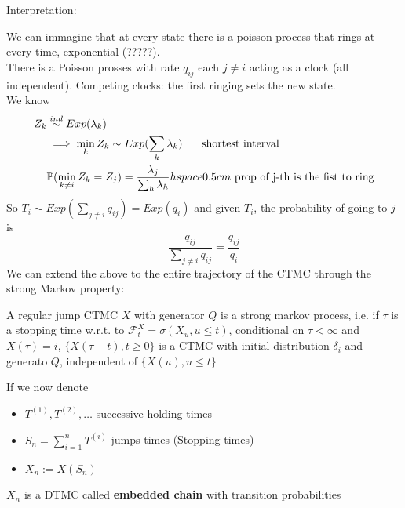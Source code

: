 \documentclass{article}
\begin{document}
Interpretation:
\begin{figure}[H]
	\centering
	
\end{figure}
We can immagine that at every state there is a poisson process that rings at every time, exponential (?????).\\
There is a Poisson prosses with rate $q_{ij}$ each $j \neq i$ acting as a clock (all independent). Competing clocks: the first ringing sets the new state. \\
We know 
\begin{equation*}
	\begin{split}
		Z_k &\stackrel{ind}{\sim} Exp (\lambda_k)\\
		&\implies  \min_k Z_k \sim Exp (\sum_k \lambda_k) \hspace*{0.5 cm} \text{ shortest interval}\\
		&\mathbb{P}(\min_{k\neq i} Z_k=Z_j)= \frac{\lambda_j}{\sum_h \lambda_h} hspace{0.5 cm} \text{ prop of j-th is the fist to ring}
	\end{split}
\end{equation*}
So $T_i \sim Exp(\sum_{j\neq i}q_{ij})= Exp(q_i)$ and given $T_i$, the probability of going to $j$ is 
\begin{equation*}
	\frac{q_{ij}}{\sum_{j\neq i}q_{ij}}= \frac{q_{ij}}{q_i}
\end{equation*}
We can extend the above to the entire trajectory of the CTMC through the strong Markov property:
\begin{theorem}
	A regular jump CTMC $X$ with generator $Q$ is a strong markov process, i.e. 
	if $\tau$ is a stopping time w.r.t. to $\mathcal{F}_t ^X= \sigma(X_u, u \leqslant t)$, 
	conditional on $\tau <\infty$ and $X(\tau)=i$, $\{X(\tau+t), t\geqslant 0\}$ is a CTMC with initial distribution $\delta_i$ and generato $Q$, independent of $\{X(u), u\leqslant t\}$
\end{theorem}
If we now denote 
\begin{itemize}
	\item $T^{(1)}, T^{(2)}, \dots$ successive holding times 
	\item  $S_n= \sum_{i=1}^n T^{(i)}$ jumps times (Stopping times)
	\item $X_n:= X(S_n)$
\end{itemize}
\begin{figure}[H]
	\centering
	 
\end{figure}
$X_n$ is  a DTMC called \textbf{embedded chain} with transition probabilities 
\end{document}
